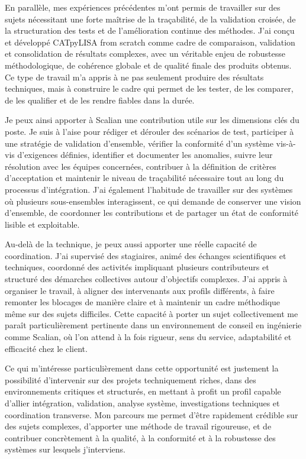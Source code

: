 \documentclass[11pt,a4paper]{altacv}
\begin{document}
{En parallèle, mes expériences précédentes m'ont permis de travailler sur des sujets nécessitant une forte maîtrise de la traçabilité, de la validation croisée, de la structuration des tests et de l'amélioration continue des méthodes. J'ai conçu et développé CATpyLISA from scratch comme cadre de comparaison, validation et consolidation de résultats complexes, avec un véritable enjeu de robustesse méthodologique, de cohérence globale et de qualité finale des produits obtenus. Ce type de travail m'a appris à ne pas seulement produire des résultats techniques, mais à construire le cadre qui permet de les tester, de les comparer, de les qualifier et de les rendre fiables dans la durée.

Je peux ainsi apporter à Scalian une contribution utile sur les dimensions clés du poste. Je suis à l'aise pour rédiger et dérouler des scénarios de test, participer à une stratégie de validation d'ensemble, vérifier la conformité d'un système vis-à-vis d'exigences définies, identifier et documenter les anomalies, suivre leur résolution avec les équipes concernées, contribuer à la définition de critères d'acceptation et maintenir le niveau de traçabilité nécessaire tout au long du processus d'intégration. J'ai également l'habitude de travailler sur des systèmes où plusieurs sous-ensembles interagissent, ce qui demande de conserver une vision d'ensemble, de coordonner les contributions et de partager un état de conformité lisible et exploitable.

Au-delà de la technique, je peux aussi apporter une réelle capacité de coordination. J'ai supervisé des stagiaires, animé des échanges scientifiques et techniques, coordonné des activités impliquant plusieurs contributeurs et structuré des démarches collectives autour d'objectifs complexes. J'ai appris à organiser le travail, à aligner des intervenants aux profils différents, à faire remonter les blocages de manière claire et à maintenir un cadre méthodique même sur des sujets difficiles. Cette capacité à porter un sujet collectivement me paraît particulièrement pertinente dans un environnement de conseil en ingénierie comme Scalian, où l'on attend à la fois rigueur, sens du service, adaptabilité et efficacité chez le client.

Ce qui m'intéresse particulièrement dans cette opportunité est justement la possibilité d'intervenir sur des projets techniquement riches, dans des environnements critiques et structurés, en mettant à profit un profil capable d'allier intégration, validation, analyse système, investigations techniques et coordination transverse. Mon parcours me permet d'être rapidement crédible sur des sujets complexes, d'apporter une méthode de travail rigoureuse, et de contribuer concrètement à la qualité, à la conformité et à la robustesse des systèmes sur lesquels j'interviens.

}
\end{document}
